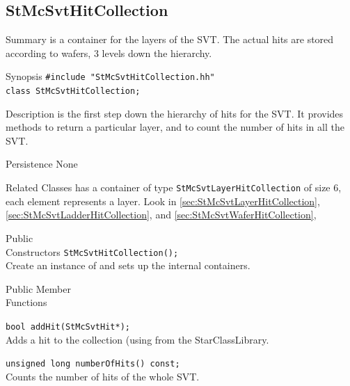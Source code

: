 \subsection{StMcSvtHitCollection}
 
\label{sec:StMcSvtHitCollection}
\begin{Entry}
\item[Summary]
     is a container for the
    layers of the SVT.  The actual hits are stored according to
    wafers, 3 levels down the hierarchy.

\item[Synopsis]
    \verb+#include "StMcSvtHitCollection.hh"+\\
    \verb+class StMcSvtHitCollection;+\\

\item[Description]
     is the first step down
    the hierarchy of hits for the SVT.  It provides
    methods to return a particular layer, and to
    count the number of hits in all the SVT.

\item[Persistence]
    None

\item[Related Classes]
    has a container of type {\tt StMcSvtLayerHitCollection}
    of size 6, each element represents a layer.  Look in
     \ref{sec:StMcSvtLayerHitCollection},
     \ref{sec:StMcSvtLadderHitCollection},
    and  \ref{sec:StMcSvtWaferHitCollection},

\item[Public\\ Constructors]
    \verb+StMcSvtHitCollection();+\\
    Create an instance of 
    and sets up the internal containers.

\item[Public Member\\ Functions]

    \verb+bool addHit(StMcSvtHit*);+\\
    Adds a hit to the collection (using 
    from the StarClassLibrary.

    \verb+unsigned long numberOfHits() const;+\\
    Counts the number of hits of the whole SVT.


\end{Entry}
